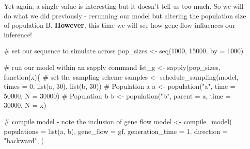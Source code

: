 \documentclass[
  letterpaper,
  DIV=11,
  numbers=noendperiod]{scrartcl}
\newenvironment{Shaded}{\begin{snugshade}}{\end{snugshade}}
\newcommand{\AttributeTok}[1]{\textcolor[rgb]{0.40,0.45,0.13}{#1}}
\newcommand{\CommentTok}[1]{\textcolor[rgb]{0.37,0.37,0.37}{#1}}
\newcommand{\ControlFlowTok}[1]{\textcolor[rgb]{0.00,0.23,0.31}{#1}}
\newcommand{\DecValTok}[1]{\textcolor[rgb]{0.68,0.00,0.00}{#1}}
\newcommand{\FunctionTok}[1]{\textcolor[rgb]{0.28,0.35,0.67}{#1}}
\newcommand{\NormalTok}[1]{\textcolor[rgb]{0.00,0.23,0.31}{#1}}
\newcommand{\OtherTok}[1]{\textcolor[rgb]{0.00,0.23,0.31}{#1}}
\newcommand{\StringTok}[1]{\textcolor[rgb]{0.13,0.47,0.30}{#1}}
\begin{document}
Yet again, a single value is interesting but it doesn't tell us too
much. So we will do what we did previously - rerunning our model but
altering the population size of population B. \textbf{However}, this
time we will see how gene flow influences our inference!

\begin{Shaded}
\begin{Highlighting}[]
\CommentTok{\# set our sequence to simulate across}
\NormalTok{pop\_sizes }\OtherTok{\textless{}{-}} \FunctionTok{seq}\NormalTok{(}\DecValTok{1000}\NormalTok{, }\DecValTok{15000}\NormalTok{, }\AttributeTok{by =} \DecValTok{1000}\NormalTok{)}

\CommentTok{\# run our model within an sapply command}
\NormalTok{fst\_g }\OtherTok{\textless{}{-}} \FunctionTok{sapply}\NormalTok{(pop\_sizes, }\ControlFlowTok{function}\NormalTok{(x)\{}
  \CommentTok{\# set the sampling scheme}
\NormalTok{  samples }\OtherTok{\textless{}{-}} \FunctionTok{schedule\_sampling}\NormalTok{(model, }\AttributeTok{times =} \DecValTok{0}\NormalTok{, }\FunctionTok{list}\NormalTok{(a, }\DecValTok{30}\NormalTok{), }\FunctionTok{list}\NormalTok{(b, }\DecValTok{30}\NormalTok{))}
  \CommentTok{\# Population a}
\NormalTok{  a }\OtherTok{\textless{}{-}} \FunctionTok{population}\NormalTok{(}\StringTok{"a"}\NormalTok{, }\AttributeTok{time =} \DecValTok{50000}\NormalTok{, }\AttributeTok{N =} \DecValTok{30000}\NormalTok{)}
  \CommentTok{\# Population b }
\NormalTok{  b }\OtherTok{\textless{}{-}} \FunctionTok{population}\NormalTok{(}\StringTok{"b"}\NormalTok{, }\AttributeTok{parent =}\NormalTok{ a, }\AttributeTok{time =} \DecValTok{30000}\NormalTok{, }\AttributeTok{N =}\NormalTok{ x)}
  
  \CommentTok{\# compile model {-} note the inclusion of gene flow}
\NormalTok{ model }\OtherTok{\textless{}{-}} \FunctionTok{compile\_model}\NormalTok{(}
  \AttributeTok{populations =} \FunctionTok{list}\NormalTok{(a, b),}
  \AttributeTok{gene\_flow =}\NormalTok{ gf,}
  \AttributeTok{generation\_time =} \DecValTok{1}\NormalTok{,}
  \AttributeTok{direction =} \StringTok{"backward"}\NormalTok{,}
\NormalTok{)}
 

\end{Highlighting}
\end{Shaded}
\end{document}

